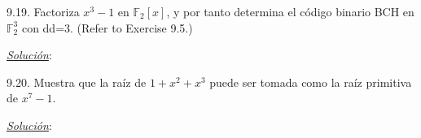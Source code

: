 





\begin{frame}  \small \begin{ejercicio} 

9.19. Factoriza $x^3-1$ en $\mathbb{F}_2[x]$, y por tanto determina el código binario BCH en $\mathbb{F}_2^3$ con dd=3.  (Refer to Exercise 9.5.)

\end{ejercicio} \pause \textit{\underline{Solución}}:\\ \end{frame} 


\begin{frame}  \small \begin{ejercicio} 

9.20. Muestra que la raíz de  $1 + x^2 + x^3$ puede ser tomada como la raíz primitiva de $x^7 - 1$.

\end{ejercicio} \pause \textit{\underline{Solución}}:\\ \end{frame} 




